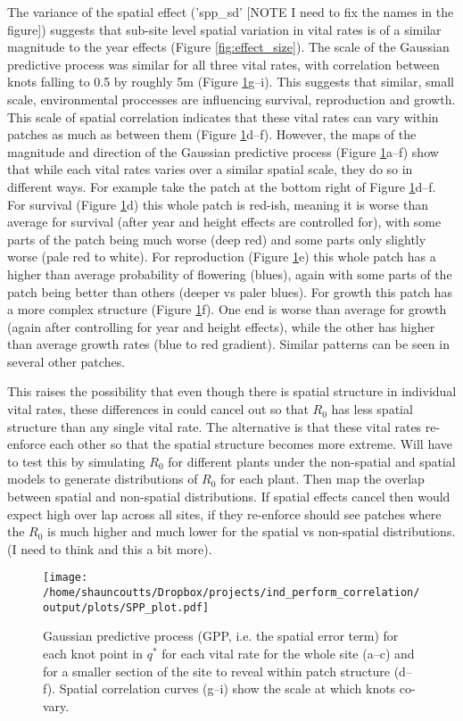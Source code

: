 \documentclass[12pt,a4paper]{article}
\begin{document}
The variance of the spatial effect ('spp\_sd' [NOTE I need to fix the names in the figure]) suggests that sub-site level spatial variation in vital rates is of a similar magnitude to the year effects (Figure \ref{fig:effect_size}). The scale of the Gaussian predictive process was similar for all three vital rates, with correlation between knots falling to 0.5 by roughly 5m (Figure \ref{fig:GPP_map}g--i). This suggests that similar, small scale, environmental proccesses are influencing survival, reproduction and growth. This scale of spatial correlation indicates that these vital rates can vary within patches as much as between them (Figure \ref{fig:GPP_map}d--f). However, the maps of the magnitude and direction of the Gaussian predictive process (Figure \ref{fig:GPP_map}a--f) show that while each vital rates varies over a similar spatial scale, they do so in different ways. For example take the patch at the bottom right of Figure \ref{fig:GPP_map}d--f. For survival (Figure \ref{fig:GPP_map}d) this whole patch is red-ish, meaning it is worse than average for survival (after year and height effects are controlled for), with some parts of the patch being much worse (deep red) and some parts only slightly worse (pale red to white). For reproduction (Figure \ref{fig:GPP_map}e) this whole patch has a higher than average probability of flowering (blues), again with some parts of the patch being better than others (deeper vs paler blues). For growth this patch has a more complex structure (Figure \ref{fig:GPP_map}f). One end is worse than average for growth (again after controlling for year and height effects), while the other has higher than average growth rates (blue to red gradient). Similar patterns can be seen in several other patches.

This raises the possibility that even though there is spatial structure in individual vital rates, these differences in could cancel out so that $R_0$ has less spatial structure than any single vital rate. The alternative is that these vital rates re-enforce each other so that the spatial structure becomes more extreme. Will have to test this by simulating $R_0$ for different plants under the non-spatial and spatial models to generate distributions of $R_0$ for each plant. Then map the overlap between spatial and non-spatial distributions. If spatial effects cancel then would expect high over lap across all sites, if they re-enforce should see patches where the $R_0$ is much higher and much lower for the spatial vs non-spatial distributions. (I need to think and this a bit more).                   

\begin{figure}[!h] 
	\texttt{[image: /home/shauncoutts/Dropbox/projects/ind\_perform\_correlation/output/plots/SPP\_plot.pdf]}
\caption{Gaussian predictive process (GPP, i.e. the spatial error term) for each knot point in $q^*$ for each vital rate for the whole site (a--c) and for a smaller section of the site to reveal within patch structure (d--f). Spatial correlation curves (g--i) show the scale at which knots co-vary.} 
\label{fig:GPP_map}
\end{figure}
   
 

\end{document}
